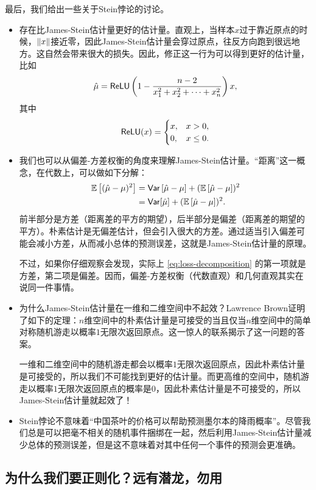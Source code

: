 最后，我们给出一些关于Stein悖论的讨论。

\begin{itemize}
    \item 存在比James-Stein估计量更好的估计量。直观上，当样本$x$过于靠近原点的时候，$\left\|x\right\|$接近零，因此James-Stein估计量会穿过原点，往反方向跑到很远地方。这自然会带来很大的损失。因此，修正这一行为可以得到更好的估计量，比如
    \[\hat\mu=\mathsf{ReLU}\left(1-\frac{n-2}{x_1^2+x_2^2+\dots+x_n^2}\right)x,\]
    其中
    \[\mathsf{ReLU}(x)=\begin{cases}
        x, & x>0,\\
        0, & x\leq 0.
    \end{cases}\]
    \item 我们也可以从偏差-方差权衡的角度来理解James-Stein估计量。“距离”这一概念，在代数上，可以做如下分解：
    \begin{align*}
    \mathbb{E}\left[(\hat{\mu}-\mu)^2\right] &= \mathsf{Var} \left[\hat{\mu}-\mu\right] + (\mathbb{E}\left[\hat{\mu}-\mu\right])^2 \\
    &= \mathsf{Var} [\hat{\mu}] + (\mathbb{E}\left[\hat{\mu}-\mu\right])^2.
    \end{align*}
    前半部分是方差（距离差的平方的期望），后半部分是偏差（距离差的期望的平方）。朴素估计是无偏差估计，但会引入很大的方差。通过适当引入偏差可能会减小方差，从而减小总体的预测误差，这就是James-Stein估计量的原理。
    
    不过，如果你仔细观察会发现，实际上 \eqref{eq:loss-decomposition} 的第一项就是方差，第二项是偏差。因而，偏差-方差权衡（代数直观）和几何直观其实在说同一件事情。

    \item 为什么James-Stein估计量在一维和二维空间中不起效？Lawrence Brown证明了如下的定理：$n$维空间中的朴素估计量是可接受的当且仅当$n$维空间中的简单对称随机游走以概率$1$无限次返回原点。这一惊人的联系揭示了这一问题的答案。
    
    一维和二维空间中的随机游走都会以概率$1$无限次返回原点，因此朴素估计量是可接受的，所以我们不可能找到更好的估计量。而更高维的空间中，随机游走以概率$1$无限次返回原点的概率是$0$，因此朴素估计量是不可接受的，所以James-Stein估计量就起效了！

    \item Stein悖论不意味着“中国茶叶的价格可以帮助预测墨尔本的降雨概率”。尽管我们总是可以把毫不相关的随机事件捆绑在一起，然后利用James-Stein估计量减少总体的预测误差，但是这不意味着对其中任何一个事件的预测会更准确。
\end{itemize}

\subsection{为什么我们要正则化？远有潜龙，勿用}

